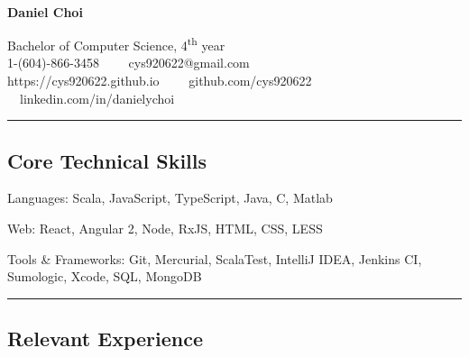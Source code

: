 \documentclass[10pt,letterpaper]{article}
\newenvironment{indentsection}[1]%
{\begin{list}{}%
	{\setlength{\leftmargin}{#1}}%
	\item[]%
}
{\end{list}}
\newcommand{\CPP}
{C\nolinebreak[4]\hspace{-.05em}\raisebox{.22ex}{\footnotesize\bf ++}}
\begin{document}

\begin{center}
\thispagestyle{firststyle}
{\LARGE \textbf{\\Daniel Choi}}

Bachelor of Computer Science, 4\textsuperscript{th} year
\\
1-(604)-866-3458\ \ \textbullet
\ \ cys920622@gmail.com
\\
https://cys920622.github.io\ \ \textbullet
\ \ github.com/cys920622\ \ \textbullet
\ \ linkedin.com/in/danielychoi
\end{center}

\hrule
\vspace{-0.4em}

\subsection*{Core Technical Skills}

\begin{indentsection}{\parindent}
\begin{description*}
	\item[Languages:]
	Scala, JavaScript, TypeScript, Java, \CPP, Matlab
	\item[Web:]
	React, Angular 2, Node, RxJS, HTML, CSS, LESS
	\item[Tools \& Frameworks:]
	Git, Mercurial, ScalaTest, IntelliJ IDEA, Jenkins CI, Sumologic, Xcode, SQL, MongoDB
\end{description*}
\end{indentsection}


\hrule
\vspace{-0.4em}

\subsection*{Relevant Experience}
\end{document}

